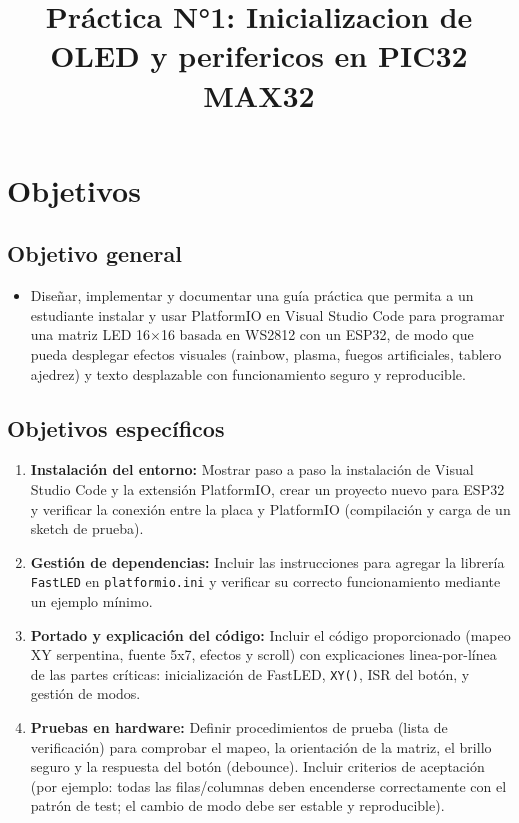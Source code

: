 \documentclass[a4paper,12pt]{article}
\title{Práctica N°1: Inicializacion de OLED y perifericos en PIC32 MAX32}
\date{}
\begin{document}
\maketitle
\tableofcontents
\newpage

\section{Objetivos}

\subsection{Objetivo general}
\begin{itemize}
  \item Diseñar, implementar y documentar una guía práctica que permita a un estudiante instalar y usar PlatformIO en Visual Studio Code para programar una matriz LED 16\(\times\)16 basada en WS2812 con un ESP32, de modo que pueda desplegar efectos visuales (rainbow, plasma, fuegos artificiales, tablero ajedrez) y texto desplazable con funcionamiento seguro y reproducible.
\end{itemize}

\subsection{Objetivos específicos}
\begin{enumerate}
  \item \textbf{Instalación del entorno:} Mostrar paso a paso la instalación de Visual Studio Code y la extensión PlatformIO, crear un proyecto nuevo para ESP32 y verificar la conexión entre la placa y PlatformIO (compilación y carga de un sketch de prueba).
  \item \textbf{Gestión de dependencias:} Incluir las instrucciones para agregar la librería \texttt{FastLED} en \texttt{platformio.ini} y verificar su correcto funcionamiento mediante un ejemplo mínimo.
  \item \textbf{Portado y explicación del código:} Incluir el código proporcionado (mapeo XY serpentina, fuente 5x7, efectos y scroll) con explicaciones linea-por-línea de las partes críticas: inicialización de FastLED, \texttt{XY()}, ISR del botón, y gestión de modos.
  \item \textbf{Pruebas en hardware:} Definir procedimientos de prueba (lista de verificación) para comprobar el mapeo, la orientación de la matriz, el brillo seguro y la respuesta del botón (debounce). Incluir criterios de aceptación (por ejemplo: todas las filas/columnas deben encenderse correctamente con el patrón de test; el cambio de modo debe ser estable y reproducible).
\end{enumerate}
\end{document}
